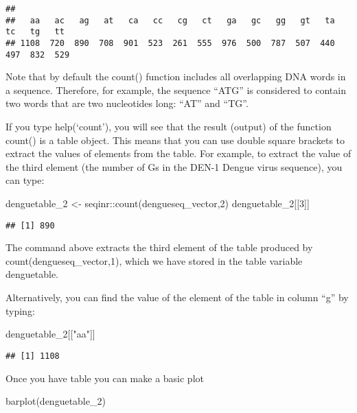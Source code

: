\documentclass[
]{book}
\newenvironment{Shaded}{\begin{snugshade}}{\end{snugshade}}
\newcommand{\DecValTok}[1]{\textcolor[rgb]{0.00,0.00,0.81}{#1}}
\newcommand{\FunctionTok}[1]{\textcolor[rgb]{0.00,0.00,0.00}{#1}}
\newcommand{\NormalTok}[1]{#1}
\newcommand{\OtherTok}[1]{\textcolor[rgb]{0.56,0.35,0.01}{#1}}
\newcommand{\SpecialCharTok}[1]{\textcolor[rgb]{0.00,0.00,0.00}{#1}}
\newcommand{\StringTok}[1]{\textcolor[rgb]{0.31,0.60,0.02}{#1}}
\begin{document}
\begin{verbatim}
## 
##   aa   ac   ag   at   ca   cc   cg   ct   ga   gc   gg   gt   ta   tc   tg   tt 
## 1108  720  890  708  901  523  261  555  976  500  787  507  440  497  832  529
\end{verbatim}

Note that by default the count() function includes all overlapping DNA words in a sequence. Therefore, for example, the sequence ``ATG'' is considered to contain two words that are two nucleotides long: ``AT'' and ``TG''.

If you type help(`count'), you will see that the result (output) of the function count() is a table object. This means that you can use double square brackets to extract the values of elements from the table. For example, to extract the value of the third element (the number of Gs in the DEN-1 Dengue virus sequence), you can type:

\begin{Shaded}
\begin{Highlighting}[]
\NormalTok{denguetable\_2 }\OtherTok{\textless{}{-}}\NormalTok{ seqinr}\SpecialCharTok{::}\FunctionTok{count}\NormalTok{(dengueseq\_vector,}\DecValTok{2}\NormalTok{)}
\NormalTok{denguetable\_2[[}\DecValTok{3}\NormalTok{]]}
\end{Highlighting}
\end{Shaded}

\begin{verbatim}
## [1] 890
\end{verbatim}

The command above extracts the third element of the table produced by count(dengueseq\_vector,1), which we have stored in the table variable denguetable.

Alternatively, you can find the value of the element of the table in column ``g'' by typing:

\begin{Shaded}
\begin{Highlighting}[]
\NormalTok{denguetable\_2[[}\StringTok{"aa"}\NormalTok{]]}
\end{Highlighting}
\end{Shaded}

\begin{verbatim}
## [1] 1108
\end{verbatim}

Once you have table you can make a basic plot

\begin{Shaded}
\begin{Highlighting}[]
\FunctionTok{barplot}\NormalTok{(denguetable\_2)}
\end{Highlighting}
\end{Shaded}
\end{document}
